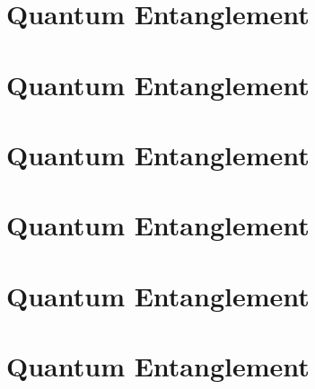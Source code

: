 \documentclass[]{article}
\begin{document}
\section{Quantum Entanglement}
\section{Quantum Entanglement}
\section{Quantum Entanglement}
\section{Quantum Entanglement}
\section{Quantum Entanglement}
\section{Quantum Entanglement}


\raggedright

\end{document}
